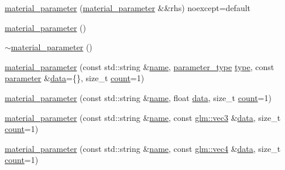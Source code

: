 \begin{DoxyCompactItemize}
\item 
\mbox{\hyperlink{structmoka_1_1material__parameter_a15faed252da4c4f69aaf358ea5b028d2}{material\+\_\+parameter}} (\mbox{\hyperlink{structmoka_1_1material__parameter}{material\+\_\+parameter}} \&\&rhs) noexcept=default
\item 
\mbox{\hyperlink{structmoka_1_1material__parameter_a4622b6af2ed13f678f8ab2580c4e1e49}{material\+\_\+parameter}} ()
\item 
\mbox{\hyperlink{structmoka_1_1material__parameter_a7adaa547ba65b7cf7af429b1a636ec0b}{$\sim$material\+\_\+parameter}} ()
\item 
\mbox{\hyperlink{structmoka_1_1material__parameter_ad21005bd31de53e916f6ae74eec894bc}{material\+\_\+parameter}} (const std\+::string \&\mbox{\hyperlink{structmoka_1_1material__parameter_a9bac68a3935142d56b14332f33b71dc2}{name}}, \mbox{\hyperlink{namespacemoka_aed2224bc0e5b79e57a8975ded94ee1aa}{parameter\+\_\+type}} \mbox{\hyperlink{structmoka_1_1material__parameter_a4a9035370e7b6c97cf89275c712cbd9e}{type}}, const \mbox{\hyperlink{namespacemoka_afdb5f6e8afb209971d12dec045ec48ee}{parameter}} \&\mbox{\hyperlink{structmoka_1_1material__parameter_a13f49bc49ae262cc75f8717869f769eb}{data}}=\{\}, size\+\_\+t \mbox{\hyperlink{structmoka_1_1material__parameter_ad55b26c96a233450607753c895440581}{count}}=1)
\item 
\mbox{\hyperlink{structmoka_1_1material__parameter_abec6b4aee4053145b455ab53cd5a7bac}{material\+\_\+parameter}} (const std\+::string \&\mbox{\hyperlink{structmoka_1_1material__parameter_a9bac68a3935142d56b14332f33b71dc2}{name}}, float \mbox{\hyperlink{structmoka_1_1material__parameter_a13f49bc49ae262cc75f8717869f769eb}{data}}, size\+\_\+t \mbox{\hyperlink{structmoka_1_1material__parameter_ad55b26c96a233450607753c895440581}{count}}=1)
\item 
\mbox{\hyperlink{structmoka_1_1material__parameter_a6e86cf0f01e3b243a160d7d0cce0508a}{material\+\_\+parameter}} (const std\+::string \&\mbox{\hyperlink{structmoka_1_1material__parameter_a9bac68a3935142d56b14332f33b71dc2}{name}}, const \mbox{\hyperlink{namespacemoka_aed2224bc0e5b79e57a8975ded94ee1aaa97ade28e93c0de60adc075bdbe07ca36}{glm\+::vec3}} \&\mbox{\hyperlink{structmoka_1_1material__parameter_a13f49bc49ae262cc75f8717869f769eb}{data}}, size\+\_\+t \mbox{\hyperlink{structmoka_1_1material__parameter_ad55b26c96a233450607753c895440581}{count}}=1)
\item 
\mbox{\hyperlink{structmoka_1_1material__parameter_ab1efc547029ed584fe554a6d10ed9acb}{material\+\_\+parameter}} (const std\+::string \&\mbox{\hyperlink{structmoka_1_1material__parameter_a9bac68a3935142d56b14332f33b71dc2}{name}}, const \mbox{\hyperlink{namespacemoka_aed2224bc0e5b79e57a8975ded94ee1aaa1a9028fd802c481a99491a418ca2fe86}{glm\+::vec4}} \&\mbox{\hyperlink{structmoka_1_1material__parameter_a13f49bc49ae262cc75f8717869f769eb}{data}}, size\+\_\+t \mbox{\hyperlink{structmoka_1_1material__parameter_ad55b26c96a233450607753c895440581}{count}}=1)

\end{DoxyCompactItemize}
